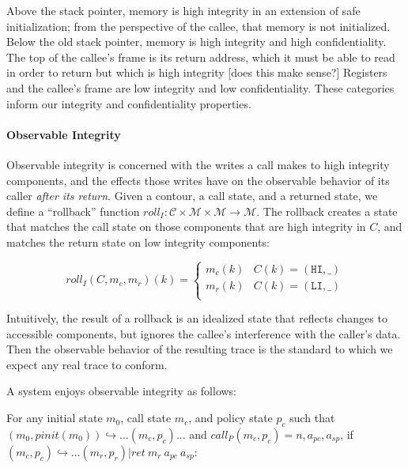 \documentclass[conference]{IEEEtran}
\begin{document}
      Above the stack pointer, memory is high integrity in an extension of safe initialization;
      from the perspective of the callee, that memory is not initialized. Below the old stack
      pointer, memory is high integrity and high confidentiality. The top of the callee's frame
      is its return address, which it must be able to read in order to return but which is
      high integrity [does this make sense?] Registers and the callee's frame are low integrity
      and low confidentiality. These categories inform our integrity and confidentiality properties.

    \paragraph{Observable Integrity}

      Observable integrity is concerned with the writes a call makes to high integrity components,
      and the effects those writes have on the observable behavior of its caller
      {\it after its return}. Given a contour, a call state, and a returned state, we define
      a ``rollback'' function \(\mathit{roll}_I : \mathcal{C} \times \mathcal{M} \times \mathcal{M}
      \rightarrow \mathcal{M}\). The rollback creates a state that matches the call
      state on those components that are high integrity in \(C\), and matches the return state
      on low integrity components:

      \[\mathit{roll}_I(C,m_c,m_r)(k) =
      \begin{cases}
        m_c(k) & C(k) = (\mathtt{HI},\_) \\
        m_r(k) & C(k) = (\mathtt{LI},\_) \\
      \end{cases}\]

      Intuitively, the result of a rollback is an idealized state that reflects changes to accessible
      components, but ignores the callee's interference with the caller's data. Then the observable
      behavior of the resulting trace is the standard to which we expect any real trace to conform.

      A system enjoys observable integrity as follows:

      For any initial state \(m_0\), call state \(m_c\), and policy state \(p_c\) such that
      \((m_0,\mathit{pinit}(m_0)) \hookrightarrow ... (m_c,p_c) ...\)
      and \(\mathit{call}_P(m_c,p_c) = n,a_{pc},a_{sp}\), if 
      \((m_c,p_c) \hookrightarrow ... (m_r,p_r) | \mathit{ret}\ m_r\ a_{pc}\ a_{sp}\):
\end{document}
